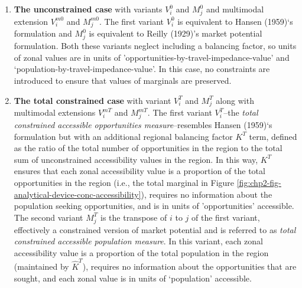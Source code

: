 \documentclass[
11pt, %
oneside, %
english, %
singlespacing, %
]{macthesis} %
\begin{document}
\begin{enumerate}
\def\labelenumi{\arabic{enumi}.}
\item
  \textbf{The unconstrained case} with variants \(V_i^0\) and \(M_j^0\) and multimodal extension \(V_i^{m0}\) and \(M_j^{m0}\). The first variant \(V_i^0\) is equivalent to Hansen (1959)`s formulation and \(M_j^0\) is equivalent to Reilly (1929)'s market potential formulation. Both these variants neglect including a balancing factor, so units of zonal values are in units of 'opportunities-by-travel-impedance-value' and `population-by-travel-impedance-value'. In this case, no constraints are introduced to ensure that values of marginals are preserved.
\item
  \textbf{The total constrained case} with variant \(V_i^T\) and \(M_j^T\) along with multimodal extensions \(V_i^{mT}\) and \(M_j^{mT}\). The first variant \(V_i^T\)--the \emph{total constrained accessible opportunities measure}--resembles Hansen (1959)`s formulation but with an additional regional balancing factor \(K^T\) term, defined as the ratio of the total number of opportunities in the region to the total sum of unconstrained accessibility values in the region. In this way, \(K^T\) ensures that each zonal accessibility value is a proportion of the total opportunities in the region (i.e., the total marginal in Figure \ref{fig:chp2-fig-analytical-device-conc-accessibility}), requires no information about the population seeking opportunities, and is in units of 'opportunities' accessible. The second variant \(M_j^T\) is the transpose of \(i\) to \(j\) of the first variant, effectively a constrained version of market potential and is referred to as \emph{total constrained accessible population measure}. In this variant, each zonal accessibility value is a proportion of the total population in the region (maintained by \(\hat K^T\)), requires no information about the opportunities that are sought, and each zonal value is in units of `population' accessible.
\end{enumerate}
\end{document}
